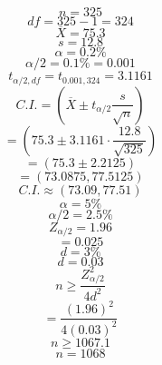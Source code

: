 \documentclass{article}
\begin{document}
    $$n=325$$
$$df = 325-1 = 324$$
$$\overline{X} = 75.3$$
$$s=12.8$$
$$\alpha = 0.2\%$$
$$\alpha/2 = 0.1\% = 0.001$$
$$t_{\alpha/2,df} = t_{0.001,324} = 3.1161$$
$$C.I. = (\overline{X} \pm t_{\alpha/2} \frac{s}{\sqrt{n}})$$
$$= (75.3 \pm 3.1161 \cdot \frac{12.8}{\sqrt{325}})$$
$$= (75.3 \pm 2.2125)$$
$$= (73.0875, 77.5125)$$
$$C.I. \approx (73.09, 77.51)$$
$$\alpha = 5\%$$
$$\alpha/2 = 2.5\%$$
$$Z_{\alpha/2} = 1.96$$
$$= 0.025$$
$$d = 3\%$$
$$d=0.03$$
$$n \ge \frac{Z_{\alpha/2}^2}{4d^2}$$
$$ = \frac{(1.96)^2}{4(0.03)^2}$$
$$n \ge 1067.1$$
$$n=1068$$

    
\end{document}
